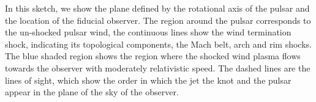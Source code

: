 In this sketch, we show the plane defined by the rotational axis of
the pulsar and the location of the fiducial observer. The region around the pulsar
corresponds to the un-shocked pulsar wind, the continuous lines show the wind
termination shock, indicating its topological components, the Mach belt, arch
and rim shocks. The blue shaded region shows the region where the shocked
wind plasma flows towards the observer with moderately relativistic speed. The
dashed lines are the lines of sight, which show the order in which the jet the
knot and the pulsar appear in the plane of the sky of the observer.